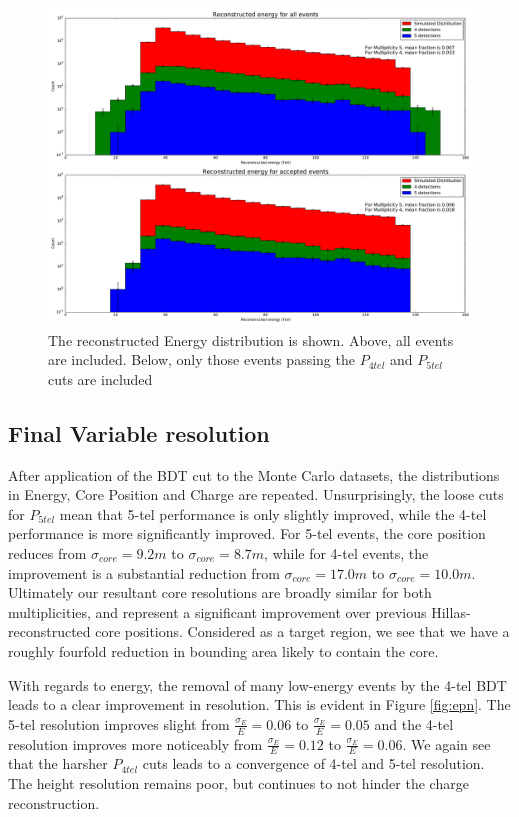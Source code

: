 \documentclass[11pt]{article}
\begin{document}
\begin{figure}
\begin{center}
\includegraphics[width=\textwidth]{energymap}
\caption{The reconstructed Energy distribution is shown. Above, all events are included. Below, only those events passing the $P_{4tel}$ and $P_{5tel}$ cuts are included}
\label{fig:energy}
\end{center}
\end{figure} 

\subsection{Final Variable resolution}
After application of the BDT cut to the Monte Carlo datasets, the distributions in Energy, Core Position and
Charge are repeated. Unsurprisingly, the loose cuts for $P_{5tel}$ mean that 5-tel performance is only slightly improved, while the 4-tel performance is more significantly improved. For 5-tel events, the core position reduces from $\sigma_{core} = 9.2m$ to $\sigma_{core} = 8.7m$, while for 4-tel events, the improvement is a substantial reduction from $\sigma_{core} = 17.0m$ to $\sigma_{core} = 10.0m$. Ultimately our resultant core resolutions are broadly similar for both multiplicities, and represent a significant improvement over previous Hillas-reconstructed core positions. Considered as a target region, we see that we have a roughly fourfold reduction in bounding area likely to contain the core. 

With regards to energy, the removal of many low-energy events by the 4-tel BDT leads to a clear improvement in resolution. This is evident in Figure \ref{fig:epn}. The 5-tel resolution improves slight from $\frac{\sigma_{E}}{E} = 0.06$ to $\frac{\sigma_{E}}{E} = 0.05$ and the 4-tel resolution improves more noticeably from $\frac{\sigma_{E}}{E} = 0.12$ to $\frac{\sigma_{E}}{E} = 0.06$. We again see that the harsher $P_{4tel}$ cuts leads to a convergence of 4-tel and 5-tel resolution. The height resolution remains poor, but continues to not hinder the charge reconstruction.
\end{document}
